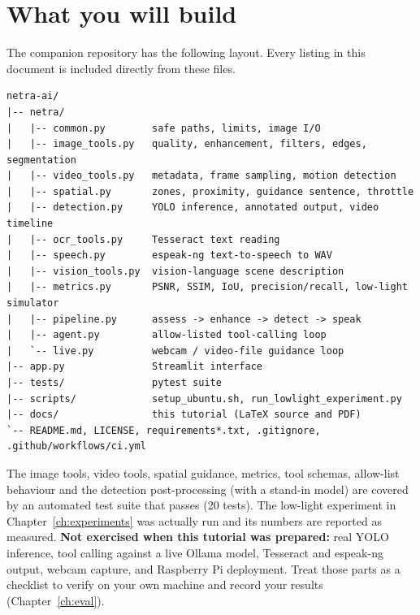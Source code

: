 \section{What you will build}
The companion repository has the following layout. Every listing in this document is included directly from these files.
\begin{lstlisting}[style=plain]
netra-ai/
|-- netra/
|   |-- common.py        safe paths, limits, image I/O
|   |-- image_tools.py   quality, enhancement, filters, edges, segmentation
|   |-- video_tools.py   metadata, frame sampling, motion detection
|   |-- spatial.py       zones, proximity, guidance sentence, throttle
|   |-- detection.py     YOLO inference, annotated output, video timeline
|   |-- ocr_tools.py     Tesseract text reading
|   |-- speech.py        espeak-ng text-to-speech to WAV
|   |-- vision_tools.py  vision-language scene description
|   |-- metrics.py       PSNR, SSIM, IoU, precision/recall, low-light simulator
|   |-- pipeline.py      assess -> enhance -> detect -> speak
|   |-- agent.py         allow-listed tool-calling loop
|   `-- live.py          webcam / video-file guidance loop
|-- app.py               Streamlit interface
|-- tests/               pytest suite
|-- scripts/             setup_ubuntu.sh, run_lowlight_experiment.py
|-- docs/                this tutorial (LaTeX source and PDF)
`-- README.md, LICENSE, requirements*.txt, .gitignore, .github/workflows/ci.yml
\end{lstlisting}

\begin{notebox}
The image tools, video tools, spatial guidance, metrics, tool schemas, allow-list behaviour and the detection
post-processing (with a stand-in model) are covered by an automated test suite that passes (20 tests). The low-light
experiment in Chapter~\ref{ch:experiments} was actually run and its numbers are reported as measured.
\textbf{Not exercised when this tutorial was prepared:} real YOLO inference, tool calling against a live Ollama model,
Tesseract and espeak-ng output, webcam capture, and Raspberry Pi deployment. Treat those parts as a checklist to verify on
your own machine and record your results (Chapter~\ref{ch:eval}).
\end{notebox}

